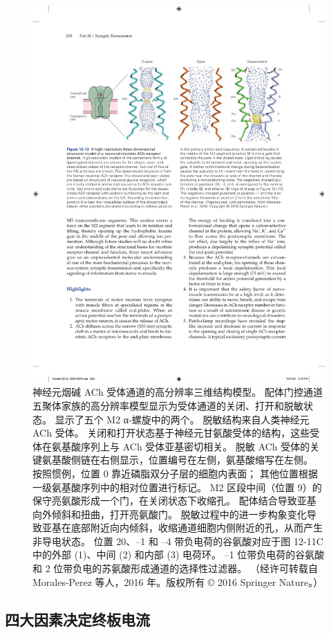 \begin{figure}[htbp]
	\centering
	\includegraphics[width=0.9\linewidth]{chap12/fig_12_12}
	\caption{神经元烟碱 ACh 受体通道的高分辨率三维结构模型。 配体门控通道五聚体家族的高分辨率模型显示为受体通道的关闭、打开和脱敏状态。 显示了五个 M2 α-螺旋中的两个。 脱敏结构来自人类神经元 ACh 受体。 关闭和打开状态基于神经元甘氨酸受体的结构，这些受体在氨基酸序列上与 ACh 受体亚基密切相关。 脱敏 ACh 受体的关键氨基酸侧链在右侧显示，位置编号在左侧，氨基酸缩写在左侧。 按照惯例，位置 0 靠近磷脂双分子层的细胞内表面； 其他位置根据一级氨基酸序列中的相对位置进行标记。 M2 区段中间（位置 9）的保守亮氨酸形成一个门，在关闭状态下收缩孔。 配体结合导致亚基向外倾斜和扭曲，打开亮氨酸门。 脱敏过程中的进一步构象变化导致亚基在底部附近向内倾斜，收缩通道细胞内侧附近的孔，从而产生非导电状态。 位置 20、–1 和 –4 带负电荷的谷氨酸对应于图 12-11C 中的外部 (1)、中间 (2) 和内部 (3) 电荷环。 –1 位带负电荷的谷氨酸和 2 位带负电的苏氨酸形成通道的选择性过滤器。 （经许可转载自 Morales-Perez 等人，2016 年。版权所有 © 2016 Springer Nature。）}
	\label{fig:12_12}
\end{figure}


\subsection{四大因素决定终板电流}

